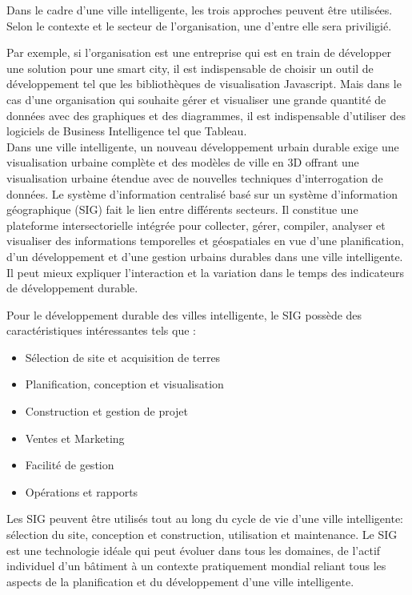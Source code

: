 \documentclass[french, a4paper, 12pt]{report}
\begin{document}
Dans le cadre d’une ville intelligente, les trois approches peuvent être utilisées. Selon le contexte et le secteur de l’organisation, une d'entre elle sera priviligié.

Par exemple, si l’organisation est une entreprise qui est en train de développer une solution pour une smart city, il est indispensable de choisir un outil de développement tel que les bibliothèques de visualisation Javascript. Mais dans le cas d’une organisation qui souhaite gérer et visualiser une grande quantité de données avec des graphiques et des diagrammes, il est indispensable d’utiliser des logiciels de Business Intelligence tel que Tableau.\\ 

Dans une ville intelligente, un nouveau développement urbain durable exige une visualisation urbaine complète et des modèles de ville en 3D offrant une visualisation urbaine étendue avec de nouvelles techniques d'interrogation de données. Le système d’information centralisé basé sur un système d’information géographique (SIG) fait le lien entre différents secteurs. Il constitue une plateforme intersectorielle intégrée pour collecter, gérer, compiler, analyser et visualiser des informations temporelles et géospatiales en vue d’une planification, d’un développement et d’une gestion urbains durables dans une ville intelligente. Il peut mieux expliquer l'interaction et la variation dans le temps des indicateurs de développement durable. 

Pour le développement durable des villes intelligente, le SIG possède des
caractéristiques intéressantes tels que : 
\begin{itemize}
  \item Sélection de site et acquisition de terres
  \item Planification, conception et visualisation
  \item Construction et gestion de projet
  \item Ventes et Marketing
  \item Facilité de gestion
  \item Opérations et rapports
\end{itemize}

Les SIG peuvent être utilisés tout au long du cycle de vie d'une ville intelligente: sélection du site, conception et construction, utilisation et maintenance. Le SIG est une technologie idéale qui peut évoluer dans tous les domaines, de l'actif individuel d'un bâtiment à un contexte pratiquement mondial reliant tous les aspects de la planification et du développement d'une ville intelligente.
\end{document}
